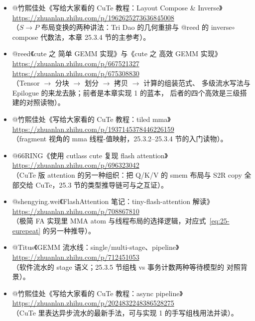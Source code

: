 \begin{itemize}
  \item @竹熙佳处《写给大家看的 CuTe 教程：Layout Compose \& Inverse》\\
        \url{https://zhuanlan.zhihu.com/p/1962625273636845008}\\
        （$S\to P$ 布局变换的两种讲法：Tri Dao 的几何重排与 @reed 的
        inverse$\circ$compose 代数法，本章 25.3.4 节的主参考）。
  \item @reed《cute 之 简单 GEMM 实现》与《cute 之 高效 GEMM 实现》\\
        \url{https://zhuanlan.zhihu.com/p/667521327}\\
        \url{https://zhuanlan.zhihu.com/p/675308830}\\
        （Tensor $\to$ 分块 $\to$ 划分 $\to$ 拷贝 $\to$ 计算的组装范式、
        多级流水写法与 Epilogue 的来龙去脉；前者是本章实现 1 的蓝本，
        后者的四个高效是三级搭建的对照读物）。
  \item @竹熙佳处《写给大家看的 CuTe 教程：tiled mma》\\
        \url{https://zhuanlan.zhihu.com/p/1937145378446226159}\\
        （fragment 视角的 mma 线程-值映射，25.3.2--25.3.4 节的入门读物）。
  \item @66RING《使用 cutlass cute 复现 flash attention》\\
        \url{https://zhuanlan.zhihu.com/p/696323042}\\
        （CuTe 版 attention 的另一种组织：把 Q/K/V 的 smem 布局与 S2R copy
        全部交给 CuTe，25.3 节的类型推导链可与之互证）。
  \item @shengying.wei《FlashAttention 笔记：tiny-flash-attention 解读》\\
        \url{https://zhuanlan.zhihu.com/p/708867810}\\
        （极简 FA 实现里 MMA atom 与线程布局的选择逻辑，对应式~\eqref{eq:25-eurepeat}
        的另一种推导）。
  \item @Titus《GEMM 流水线：single/multi-stage、pipeline》\\
        \url{https://zhuanlan.zhihu.com/p/712451053}\\
        （软件流水的 stage 语义；25.3.5 节组栈 vs 事务计数两种等待模型的
        对照背景）。
  \item @竹熙佳处《写给大家看的 CuTe 教程：async pipeline》\\
        \url{https://zhuanlan.zhihu.com/p/2024832248386528275}\\
        （CuTe 里表达异步流水的最新手法，可与实现 1 的手写组栈用法并读）。
\end{itemize}
